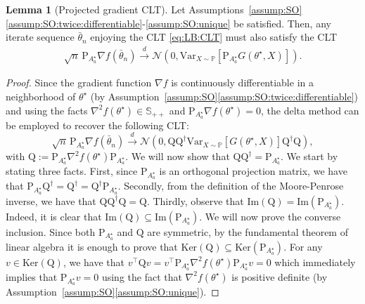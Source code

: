 \documentclass[11pt,a4paper]{article}
\theoremstyle{definition}
\newtheorem{lemma}[theorem]{Lemma}
\newcommand{\mb}{\mathbb}
\begin{document}
\begin{lemma}[Projected gradient CLT]
\label{lemma:kkt-residual}
Let Assumptions~\ref{assump:SO}\ref{assump:SO:twice:differentiable}-\ref{assump:SO:unique} be satisfied. Then, any iterate sequence $\bar \theta_n$ enjoying the CLT \eqref{eq:LB:CLT} must also satisfy the CLT
\begin{align}
\label{eq:NDA:CLT}
    \sqrt{n}\, \text{P}_{A^\star_{a}}  \nabla f(\bar{\theta}_n) \overset{d}{\to} \mathcal N \left(0, \text{Var}_{X \sim \mathbb P}\left[\text{P}_{A^\star_{a}} G(\theta^\star,X) \right] \right).
\end{align}
\end{lemma}
\begin{proof}
Since the gradient function $\nabla f$ is continuously differentiable in a neighborhood of $\theta^\star$ (by Assumption~\ref{assump:SO}\ref{assump:SO:twice:differentiable}) and using the facts $\nabla^2 f(\theta^\star) \in \mb S_{++}$ and $\text{P}_{A^\star_{a}} \nabla f(\theta^\star) = 0$, the delta method can be employed to recover the following CLT:
\[
  \sqrt{n}\, \text{P}_{A^\star_{a}}  \nabla f(\bar{\theta}_n) \overset{d}{\to} \mathcal N \left(0, \text{Q} \text{Q}^{\dagger} \text{Var}_{X \sim \mathbb P}\left[G(\theta^\star,X) \right] \text{Q}^{\dagger} \text{Q} \right),
\]
with $\text{Q}:=\text{P}_{A^\star_{a}}\nabla^2  f(\theta^\star) \text{P}_{A^\star_{a}}$. We will now show that $\text{Q}\text{Q}^\dagger = \text{P}_{A^\star_{a}}$. We start by stating three facts. First, since $\text{P}_{A^\star_a}$ is an orthogonal projection matrix, we have that $\text{P}_{A^\star_a} \text{Q}^{\dagger} = \text{Q}^\dagger = \text{Q}^\dagger \text{P}_{A^\star_a}$. Secondly, from the definition of the Moore-Penrose inverse, we have that $\text{Q} \text{Q}^{\dagger} \text{Q} = \text{Q}$. Thirdly, observe that $\text{Im}(\text{Q}) = \text{Im}(\text{P}_{A^\star_a})$. Indeed, it is clear that $\text{Im}(\text{Q}) \subseteq \text{Im}(\text{P}_{A^\star_a})$. We will now prove the converse inclusion. Since both $\text{P}_{A^\star_{a}}$ and $\text{Q}$ are symmetric, by the fundamental theorem of linear algebra it is enough to prove that $\text{Ker}(\text{Q}) \subseteq \text{Ker}(\text{P}_{A^\star_a})$. For any $v \in \text{Ker}(\text{Q})$, we have that $v^\top \text{Q} v = v^\top \text{P}_{A^\star_{a}}\nabla^2  f(\theta^\star) \text{P}_{A^\star_{a}} v = 0$ which immediately implies that $\text{P}_{A^\star_{a}} v = 0$ using the fact that $\nabla^2  f(\theta^\star)$ is positive definite (by Assumption~\ref{assump:SO}\ref{assump:SO:unique}). 


\end{proof}
\end{document}
